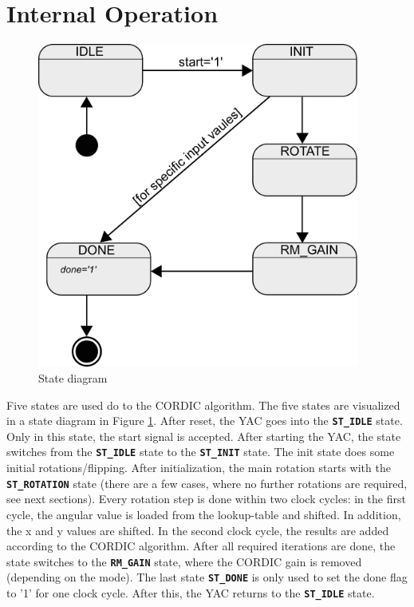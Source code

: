 \documentclass[a4paper, 12pt, notitlepage]{report}
\newcommand{\state}[1]{{\tt\textbf{#1}}}
\begin{document}
\section{Internal Operation}
\begin{figure}[p]
\centering
   \includegraphics[width=300pt]{figs/state_diagram.pdf}
   \caption{State diagram}
   \label{fig:states}
\end{figure}
Five states are used do to the CORDIC algorithm. The five states are visualized in a
state diagram in Figure \ref{fig:states}.
After reset, the YAC goes into the \state{ST\_IDLE} state. Only in this state, the 
start signal is accepted. After starting the YAC, the state switches from
the \state{ST\_IDLE} state to the \state{ST\_INIT} state. The init state does some initial 
rotations/flipping.
After initialization, the main rotation starts with the \state{ST\_ROTATION} state
(there are a few cases, where no further rotations are required, see next sections).
Every rotation step is done within two clock cycles: in the first cycle, 
the angular value is loaded from the lookup-table and shifted. In addition, 
the x and y values are shifted. In the second
clock cycle, the results are added according to the CORDIC algorithm.
After all required iterations are done, the state switches to
the \state{RM\_GAIN} state, where the CORDIC gain is removed (depending on 
the mode). The last state \state{ST\_DONE} is only used to set the done flag to 
'1' for one clock cycle. After this, the YAC returns to the \state{ST\_IDLE} state.
\end{document}
